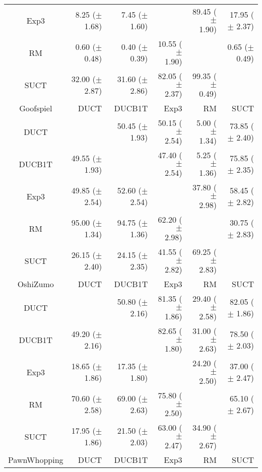 \documentclass{article}
\begin{document}
\begin{table}
\begin{center}
\begin{tabular}{|c|rrrrr|}
           Exp3    & 8.25 ($\pm$ 1.68)   & 7.45 ($\pm$ 1.60)   &              & 89.45 ($\pm$ 1.90)   & 17.95 ($\pm$ 2.37)   \\
             RM    & 0.60 ($\pm$ 0.48)   & 0.40 ($\pm$ 0.39)   & 10.55 ($\pm$ 1.90)   &              & 0.65 ($\pm$ 0.49)   \\
           SUCT    & 32.00 ($\pm$ 2.87)   & 31.60 ($\pm$ 2.86)   & 82.05 ($\pm$ 2.37)   & 99.35 ($\pm$ 0.49)   &              \\
\hline
\hline
      Goofspiel   &       DUCT   &     DUCB1T   &       Exp3   &         RM   &       SUCT   \\
\hline
           DUCT    &              & 50.45 ($\pm$ 1.93)   & 50.15 ($\pm$ 2.54)   & 5.00 ($\pm$ 1.34)   & 73.85 ($\pm$ 2.40)   \\
         DUCB1T    & 49.55 ($\pm$ 1.93)   &              & 47.40 ($\pm$ 2.54)   & 5.25 ($\pm$ 1.36)   & 75.85 ($\pm$ 2.35)   \\
           Exp3    & 49.85 ($\pm$ 2.54)   & 52.60 ($\pm$ 2.54)   &              & 37.80 ($\pm$ 2.98)   & 58.45 ($\pm$ 2.82)   \\
             RM    & 95.00 ($\pm$ 1.34)   & 94.75 ($\pm$ 1.36)   & 62.20 ($\pm$ 2.98)   &              & 30.75 ($\pm$ 2.83)   \\
           SUCT    & 26.15 ($\pm$ 2.40)   & 24.15 ($\pm$ 2.35)   & 41.55 ($\pm$ 2.82)   & 69.25 ($\pm$ 2.83)   &              \\
\hline
\hline
       OshiZumo   &       DUCT   &     DUCB1T   &       Exp3   &         RM   &       SUCT   \\
\hline
           DUCT    &              & 50.80 ($\pm$ 2.16)   & 81.35 ($\pm$ 1.86)   & 29.40 ($\pm$ 2.58)   & 82.05 ($\pm$ 1.86)   \\
         DUCB1T    & 49.20 ($\pm$ 2.16)   &              & 82.65 ($\pm$ 1.80)   & 31.00 ($\pm$ 2.63)   & 78.50 ($\pm$ 2.03)   \\
           Exp3    & 18.65 ($\pm$ 1.86)   & 17.35 ($\pm$ 1.80)   &              & 24.20 ($\pm$ 2.50)   & 37.00 ($\pm$ 2.47)   \\
             RM    & 70.60 ($\pm$ 2.58)   & 69.00 ($\pm$ 2.63)   & 75.80 ($\pm$ 2.50)   &              & 65.10 ($\pm$ 2.67)   \\
           SUCT    & 17.95 ($\pm$ 1.86)   & 21.50 ($\pm$ 2.03)   & 63.00 ($\pm$ 2.47)   & 34.90 ($\pm$ 2.67)   &              \\
\hline
\hline
   PawnWhopping   &       DUCT   &     DUCB1T   &       Exp3   &         RM   &       SUCT   \\

\end{tabular}
\end{center}
\end{table}
\end{document}
